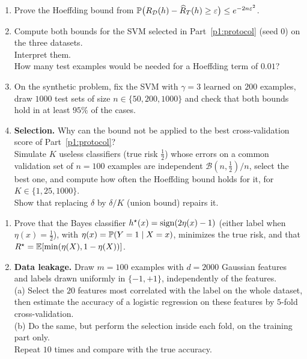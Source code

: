 \documentclass[a4paper,11pt]{article}
\begin{document}
\begin{enumerate}
\item Prove the Hoeffding bound from $\P\big(\RD(h)-\widehat R_T(h)\geq\varepsilon\big)\leq e^{-2n\varepsilon^2}$.
\item Compute both bounds for the SVM selected in Part~\ref{p1:protocol} (seed $0$) on the three datasets.\\
      Interpret them.\\
      How many test examples would be needed for a Hoeffding term of $0.01$?
\item On the synthetic problem, fix the SVM with $\gamma=3$ learned on $200$ examples, draw $1000$ test sets of size
      $n\in\{50,200,1000\}$ and check that both bounds hold in at least $95\%$ of the cases.
\item \textbf{Selection.} Why can the bound not be applied to the best cross-validation score of Part~\ref{p1:protocol}?\\
      Simulate $K$ useless classifiers (true risk $\frac12$) whose errors on a common validation set of $n=100$ examples
      are independent $\mathcal B(n,\frac12)/n$, select the best one, and compute how often the Hoeffding bound holds for
      it, for $K\in\{1,25,1000\}$.\\
      Show that replacing $\delta$ by $\delta/K$ (union bound) repairs it.
\end{enumerate}

\label{p1:far}

\begin{enumerate}
\item Prove that the Bayes classifier $h^\star(x)=\sign(2\eta(x)-1)$ (either label when $\eta(x)=\frac12$), with $\eta(x)=\P(Y=1\mid X=x)$, minimizes the true
      risk, and that $R^\star=\E[\min(\eta(X),1-\eta(X))]$.
\item \textbf{Data leakage.} Draw $m=100$ examples with $d=2000$ Gaussian features and labels drawn uniformly in
      $\{-1,+1\}$, independently of the features.\\
      (a) Select the $20$ features most correlated with the label on the
      whole dataset, then estimate the accuracy of a logistic regression on these features by $5$-fold cross-validation.\\
      (b) Do the same, but perform the selection inside each fold, on the training part only.\\
      Repeat $10$ times and
      compare with the true accuracy.
\end{enumerate}
\end{document}

